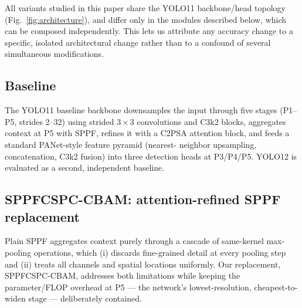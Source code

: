 \documentclass[conference]{IEEEtran}
\begin{document}
All variants studied in this paper share the YOLO11 backbone/head topology
(Fig.~\ref{fig:architecture}), and differ
only in the modules described below, which can be composed independently.
This lets us attribute any accuracy change to a specific, isolated
architectural change rather than to a confound of several simultaneous
modifications.

\subsection{Baseline}
The YOLO11 baseline backbone downsamples the input through five stages
(P1--P5, strides 2--32) using strided $3\times3$ convolutions and C3k2
blocks, aggregates context at P5 with SPPF, refines it with a C2PSA
attention block, and feeds a standard PANet-style feature pyramid (nearest-
neighbor upsampling, concatenation, C3k2 fusion) into three detection heads
at P3/P4/P5. YOLO12 is evaluated as a second, independent baseline.

\subsection{SPPFCSPC-CBAM: attention-refined SPPF replacement}
\label{sec:method-sppf}

Plain SPPF aggregates context purely through a cascade of same-kernel
max-pooling operations, which (i) discards fine-grained detail at every
pooling step and (ii) treats all channels and spatial locations uniformly.
Our replacement, SPPFCSPC-CBAM, addresses both limitations while keeping
the parameter/FLOP overhead at P5 --- the network's lowest-resolution,
cheapest-to-widen stage --- deliberately contained.
\end{document}
